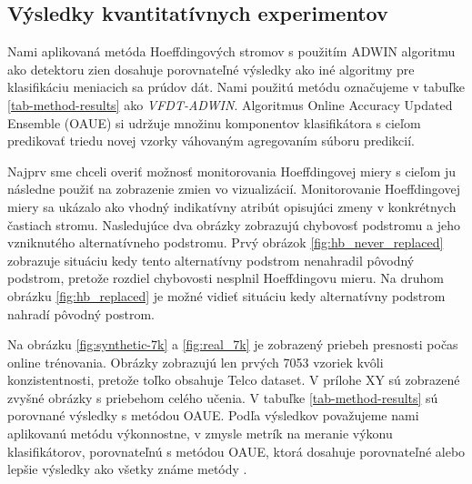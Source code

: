\subsection{Výsledky kvantitatívnych experimentov}
Nami aplikovaná metóda Hoeffdingových stromov s použitím ADWIN algoritmu ako detektoru zien dosahuje porovnateľné výsledky ako iné algoritmy pre klasifikáciu meniacich sa prúdov dát. Nami použitú metódu označujeme v tabuľke \ref{tab-method-results} ako \textit{VFDT-ADWIN}. Algoritmus Online Accuracy Updated Ensemble (OAUE) \citep{brzezinski2014prequential} si udržuje množinu komponentov klasifikátora s cieľom predikovať triedu novej vzorky váhovaným agregovaním súboru predikcií.
\par
Najprv sme chceli overiť možnosť monitorovania Hoeffdingovej miery s cieľom ju následne použiť na zobrazenie zmien vo vizualizácií. Monitorovanie Hoeffdingovej miery sa ukázalo ako vhodný indikatívny atribút opisujúci zmeny v konkrétnych častiach stromu. Nasledujúce dva obrázky zobrazujú chybovosť podstromu a jeho vzniknutého alternatívneho podstromu. Prvý obrázok \ref{fig:hb_never_replaced} zobrazuje situáciu kedy tento alternatívny podstrom nenahradil pôvodný podstrom, pretože rozdiel chybovosti nesplnil Hoeffdingovu mieru. Na druhom obrázku \ref{fig:hb_replaced} je možné vidieť situáciu kedy alternatívny podstrom nahradí pôvodný postrom.
\par
Na obrázku \ref{fig:synthetic-7k} a \ref{fig:real_7k} je zobrazený priebeh presnosti počas online trénovania. Obrázky zobrazujú len prvých 7053 vzoriek kvôli konzistentnosti, pretože toľko obsahuje Telco dataset. V prílohe XY sú zobrazené 
zvyšné obrázky s priebehom celého učenia. V tabuľke \ref{tab-method-results} sú porovnané výsledky s metódou OAUE. Podľa výsledkov považujeme nami aplikovanú metódu výkonnostne, v zmysle metrík na meranie výkonu klasifikátorov, porovnateľnú s metódou OAUE, ktorá dosahuje porovnateľné alebo lepšie výsledky ako všetky známe metódy \citep{brzezinski2014prequential}.

\label{fig:hb_never_replaced}
\label{fig:hb_replaced}

